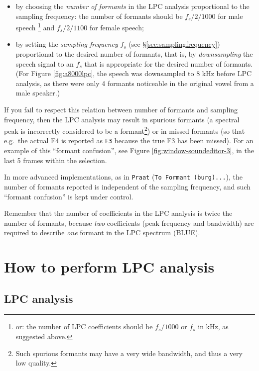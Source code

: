 \documentclass[
]{book}
\begin{document}
\begin{itemize}
  \begin{itemize}
  \item
    by choosing the \emph{number of formants} in the LPC analysis proportional to the sampling frequency: the number of formants should be \(f_s/2/1000\) for male speech \footnote{or: the number of LPC coefficients should be \(f_s/1000\) or \(f_s\) in kHz, as suggested above.} and \(f_s/2/1100\) for female speech;
  \item
    by setting the \emph{sampling frequency} \(f_s\) (see §\ref{sec:samplingfrequency}) proportional to the desired number of formants, that is, by \emph{downsampling} the speech signal to an \(f_s\) that is appropriate for the desired number of formants. (For Figure \ref{fig:a8000lpc}, the speech was downsampled to 8 kHz before LPC analysis, as there were only 4 formants noticeable in the original vowel from a male speaker.)\\
  \end{itemize}

  If you fail to respect this relation between number of formants and sampling frequency, then the LPC analysis may result in spurious formants (a spectral peak is incorrectly considered to be a formant\footnote{Such spurious formants may have a very wide bandwidth, and thus a very low quality.}) or in missed formants (so that e.g.~the actual F4 is reported as \texttt{F3} because the true F3 has been missed).
  For an example of this ``formant confusion'', see Figure \ref{fig:window-soundeditor-3}, in the last 5 frames within the selection.

  In more advanced implementations, as in \texttt{Praat} (\texttt{To\ Formant\ (burg)...}), the number of formants reported is independent of the sampling frequency, and such ``formant confusion'' is kept under control.

  Remember that the number of coefficients in the LPC analysis is twice the number of formants, because \emph{two} coefficients (peak frequency and bandwidth) are required to describe \emph{one} formant in the LPC spectrum (BLUE).
\end{itemize}

\protect{}\label{box-praatlpc1}
\section{How to perform LPC analysis}\label{how-to-perform-lpc-analysis}

\subsection{LPC analysis}\label{sec:LPC-analysis}
\end{document}
